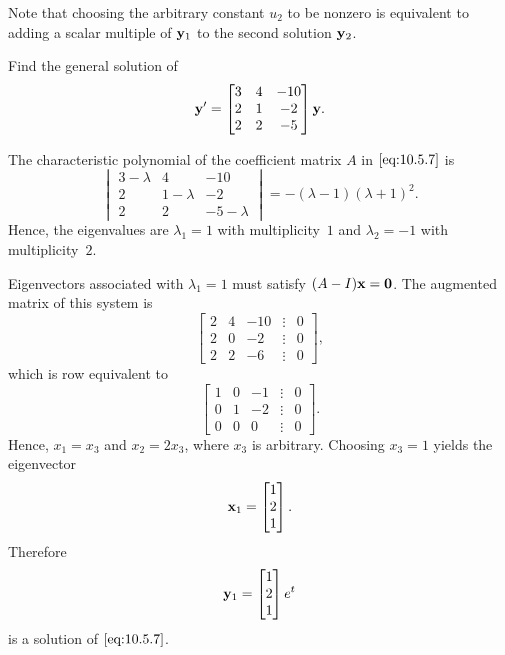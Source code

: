 \documentclass{ximera}
\begin{document}
Note that choosing the arbitrary constant $u_2$ to be nonzero is
equivalent to adding a scalar multiple of ${\bf y}_1$ to the second
solution ${\bf y}_2$. %

\begin{example}\label{example:10.5.3}
 Find the general solution of
\begin{equation}\label{eq:10.5.7}
{\bf y}'=\begin{bmatrix}3&4&-10\\2&1&-2\\2&2&-5\end{bmatrix} {\bf y}.
\end{equation}

\begin{explanation}  The characteristic polynomial of
the coefficient matrix $A$ in  $\eqref{eq:10.5.7}$ is
$$
\begin{vmatrix} 3-\lambda & 4 & -10\\ 2 & 1-\lambda &
-2\\ 2 & 2 &-5-\lambda\end{vmatrix}=-
(\lambda-1)(\lambda+1)^2.
$$
Hence, the eigenvalues are $\lambda_1=1$ with multiplicity~$1$ and
$\lambda_2=-1$ with  multiplicity~$2$.

Eigenvectors associated with $\lambda_1=1$ must satisfy $(A-I){\bf x}={\bf 0}$. The augmented matrix of this system is
$$
\begin{bmatrix} 2 & 4 & -10 &\vdots & 0\\
2& 0 & -2 &\vdots & 0\\ 2 & 2 & -6 &
\vdots & 0\end{bmatrix}, $$
which is row equivalent to
$$
\begin{bmatrix} 1 & 0 & -1 &\vdots& 0\\  0 & 1 & -2
&\vdots& 0\\ 0 & 0 & 0 &\vdots&0\end{bmatrix}.
$$
Hence, $x_1 =x_3$ and  $x_2 =2 x_3$, where $x_3$ is arbitrary.
Choosing $x_3=1$ yields the eigenvector
$$
{\bf x}_1=\begin{bmatrix}1\\2\\1\end{bmatrix}.
$$
Therefore
$$
{\bf y}_1 =\begin{bmatrix}1\\2\\1\end{bmatrix}e^t
$$
is a solution of  $\eqref{eq:10.5.7}$.


\end{explanation}
\end{example}
\end{document}
